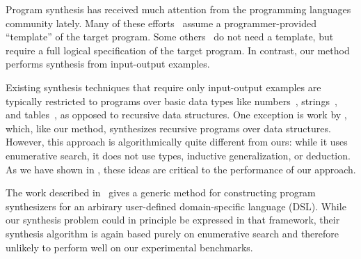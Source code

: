 Program synthesis has received much attention from the programming
languages community lately. Many of these
efforts~\cite{sketch06,SrivastavaGF13,BCPR14} assume a
programmer-provided ``template'' of the target program. Some
others~\cite{completefunctional} do not need a template, but require a
full logical specification of the target program.  In contrast, our
method performs synthesis from input-output examples.

Existing synthesis techniques that require only input-output examples  
are typically restricted to programs over basic data types like
numbers~\cite{gulwani-number}, strings~\cite{gulwani-string}, and
tables~\cite{gulwani-table}, as opposed to recursive data
structures. One exception is work by \cite{recursive-synthesis},
which, like our method, synthesizes recursive programs over data
structures. However, this approach is algorithmically quite different
from ours: while it uses enumerative search, it does not
use types, inductive generalization, or deduction. As we have shown in
, these ideas are critical to the performance of our
approach.

The work described in~\cite{test-driven} gives a generic method for 
constructing program synthesizers for an arbirary user-defined domain-specific language
(DSL). While our synthesis problem could in principle be
expressed in that framework, their synthesis algorithm is
again based purely on enumerative search and therefore unlikely to
perform well on our experimental benchmarks.


